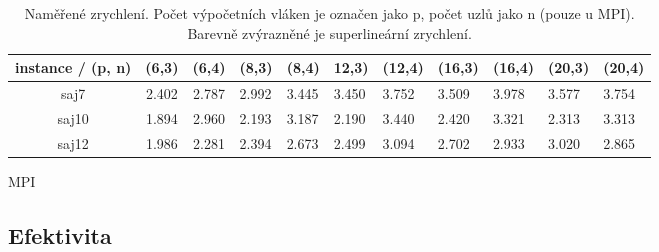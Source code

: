\documentclass{article}
\begin{document}
\begin{table}[h]
        \begin{subtable}{.5\linewidth}\centering
        \begin{tabular}{|c|c|c|l|l|l|l|l|l|l|l|}
            \hline
            \textbf{instance / (p, n)} &
            \textbf{(6,3)} &
            \textbf{(6,4)} &
            \multicolumn{1}{c|}{\textbf{(8,3)}} &
            \multicolumn{1}{c|}{\textbf{(8,4)}} &
            \multicolumn{1}{c|}{\textbf{12,3)}} &
            \multicolumn{1}{c|}{\textbf{(12,4)}} &
            \multicolumn{1}{c|}{\textbf{(16,3)}} &
            \multicolumn{1}{c|}{\textbf{(16,4)}} &
            \multicolumn{1}{c|}{\textbf{(20,3)}} &
            \multicolumn{1}{c|}{\textbf{(20,4)}} \\ \hline
            saj7  & 2.402 & 2.787 & 2.992 & 3.445 & 3.450 & 3.752 & 3.509 & 3.978 & 3.577 & 3.754 \\ \hline
            saj10 & 1.894 & 2.960 & 2.193 & 3.187 & 2.190 & 3.440 & 2.420 & 3.321 & 2.313 & 3.313 \\ \hline
            saj12 & 1.986 & 2.281 & 2.394 & 2.673 & 2.499 & 3.094 & 2.702 & 2.933 & 3.020 & 2.865 \\ \hline
        \end{tabular}
        \caption{MPI}\label{tab:speedup-mpi}
        \end{subtable}%

        \caption{Naměřené zrychlení. Počet výpočetních vláken je označen jako p, počet uzlů jako n (pouze u MPI). Barevně zvýrazněné je superlineární zrychlení.}
        \label{tab:speedup}
    \end{table}

    \subsection{Efektivita}
\end{document}
